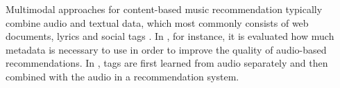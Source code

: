 Multimodal approaches for content-based music recommendation typically combine audio and textual data, which most commonly consists of web documents, lyrics and social tags \citep{liem2011need}. In \citep{Bogdanov2011}, for instance, it is evaluated how much metadata is necessary to use in order to improve the quality of audio-based recommendations. In \citep{Eck:NIPS2007}, tags are first learned from audio separately and then combined with the audio in a recommendation system. 

